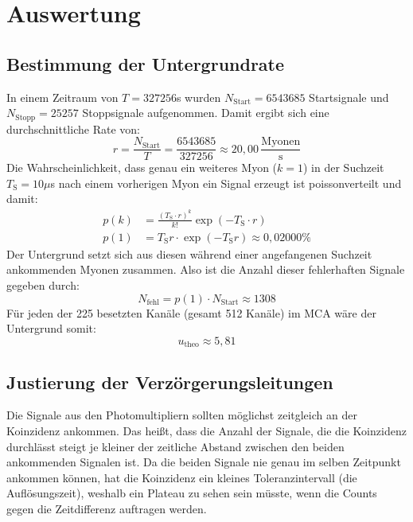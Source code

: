\newpage
\section{Auswertung}
    \subsection{Bestimmung der Untergrundrate}
        In einem Zeitraum von $T = 327256$s wurden $N_{\text{Start}} = 6543685$ Startsignale und $N_{\text{Stopp}} = 25257$
        Stoppsignale aufgenommen. Damit ergibt sich eine durchschnittliche Rate von:
        \begin{equation*}
            r = \frac{N_{\text{Start}}}{T} = \frac{6543685}{327256} \approx 20,00 \, \frac{\text{Myonen}}{\text{s}}
        \end{equation*}
        Die Wahrscheinlichkeit, dass genau ein weiteres Myon ($k = 1$) in der Suchzeit $T_\text{S} = 10\mu$s nach einem vorherigen Myon ein Signal erzeugt ist poissonverteilt und damit:
        \begin{align*}
            p(k) &= \frac{(T_{\text{S}} \cdot r)^k}{k!} \exp\left(-T_{\text{S}} \cdot r\right) \\[10pt]
            p(1) &= T_{\text{S}} r \cdot \exp\left(-T_{\text{S}}  r\right) \approx 0,02000 \%
        \end{align*}
        Der Untergrund setzt sich aus diesen während einer angefangenen Suchzeit ankommenden Myonen zusammen. Also ist die Anzahl dieser fehlerhaften Signale gegeben durch:
        \begin{equation*}
            N_{\text{fehl}} = p(1) \cdot N_{\text{Start}} \approx 1308
        \end{equation*}
        Für jeden der 225 besetzten Kanäle (gesamt 512 Kanäle) im MCA wäre der Untergrund somit:
        \begin{equation*}
            u_{\text{theo}} \approx 5,81
        \end{equation*}

    \subsection{Justierung der Verzörgerungsleitungen}
        Die Signale aus den Photomultipliern sollten möglichst zeitgleich an der Koinzidenz ankommen. Das heißt, dass die Anzahl der Signale, die die Koinzidenz durchlässt steigt je kleiner der zeitliche Abstand zwischen den beiden ankommenden Signalen ist. Da die beiden Signale nie genau im selben Zeitpunkt ankommen können, hat die Koinzidenz ein kleines Toleranzintervall (die Auflösungszeit), weshalb ein Plateau zu sehen sein müsste, wenn die Counts gegen die Zeitdifferenz auftragen werden.
        
